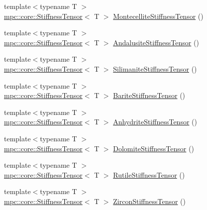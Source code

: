 \begin{DoxyCompactItemize}
\item 
{\footnotesize template$<$typename T $>$ }\\\mbox{\hyperlink{structmpc_1_1core_1_1_stiffness_tensor}{mpc\+::core\+::\+Stiffness\+Tensor}}$<$ T $>$ \mbox{\hyperlink{namespacempc_1_1data_ade8b78918c1356a574660bf9d88ea42c}{Montecellite\+Stiffness\+Tensor}} ()
\item 
{\footnotesize template$<$typename T $>$ }\\\mbox{\hyperlink{structmpc_1_1core_1_1_stiffness_tensor}{mpc\+::core\+::\+Stiffness\+Tensor}}$<$ T $>$ \mbox{\hyperlink{namespacempc_1_1data_a4f5f753af2a32f37e2e4b015c90b67c8}{Andalusite\+Stiffness\+Tensor}} ()
\item 
{\footnotesize template$<$typename T $>$ }\\\mbox{\hyperlink{structmpc_1_1core_1_1_stiffness_tensor}{mpc\+::core\+::\+Stiffness\+Tensor}}$<$ T $>$ \mbox{\hyperlink{namespacempc_1_1data_aae2a34fe404434da8c2b2d69f70c2f48}{Silimanite\+Stiffness\+Tensor}} ()
\item 
{\footnotesize template$<$typename T $>$ }\\\mbox{\hyperlink{structmpc_1_1core_1_1_stiffness_tensor}{mpc\+::core\+::\+Stiffness\+Tensor}}$<$ T $>$ \mbox{\hyperlink{namespacempc_1_1data_ac27134c807fbc4fc1000e5c897ad40c4}{Barite\+Stiffness\+Tensor}} ()
\item 
{\footnotesize template$<$typename T $>$ }\\\mbox{\hyperlink{structmpc_1_1core_1_1_stiffness_tensor}{mpc\+::core\+::\+Stiffness\+Tensor}}$<$ T $>$ \mbox{\hyperlink{namespacempc_1_1data_a68d0dd97f119f5bb16ee4c54d4206491}{Anhydrite\+Stiffness\+Tensor}} ()
\item 
{\footnotesize template$<$typename T $>$ }\\\mbox{\hyperlink{structmpc_1_1core_1_1_stiffness_tensor}{mpc\+::core\+::\+Stiffness\+Tensor}}$<$ T $>$ \mbox{\hyperlink{namespacempc_1_1data_a466031147c2c396d06aee19a9677fc84}{Dolomite\+Stiffness\+Tensor}} ()
\item 
{\footnotesize template$<$typename T $>$ }\\\mbox{\hyperlink{structmpc_1_1core_1_1_stiffness_tensor}{mpc\+::core\+::\+Stiffness\+Tensor}}$<$ T $>$ \mbox{\hyperlink{namespacempc_1_1data_a28a3e64ae03e382992bf315c7b01ef94}{Rutile\+Stiffness\+Tensor}} ()
\item 
{\footnotesize template$<$typename T $>$ }\\\mbox{\hyperlink{structmpc_1_1core_1_1_stiffness_tensor}{mpc\+::core\+::\+Stiffness\+Tensor}}$<$ T $>$ \mbox{\hyperlink{namespacempc_1_1data_acc622a3fec132f4b5472e2480e4d0f6d}{Zircon\+Stiffness\+Tensor}} ()

\end{DoxyCompactItemize}
